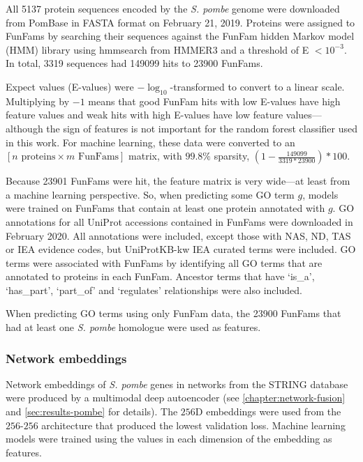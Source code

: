 All \num{5137} protein sequences encoded by the \emph{S. pombe} genome were downloaded from PomBase \cite{Lock2018} in FASTA format on February 21, 2019. Proteins were assigned to FunFams \cite{Das2015b} by searching their sequences against the FunFam hidden Markov model (HMM) library using hmmsearch from HMMER3 \cite{Mistry2013} and a threshold of E $< 10^{-3}$. In total, \num{3319} sequences had \num{149099} hits to \num{23900} FunFams.

Expect values (E-values) were $-\log_{10}$-transformed to convert to a linear scale. Multiplying by $-1$ means that good FunFam hits with low E-values have high feature values and weak hits with high E-values have low feature values---although the sign of features is not important for the random forest classifier used in this work. For machine learning, these data were converted to an $[n \text{ proteins} \times m \text{ FunFams}]$ matrix, with $99.8\%$ sparsity, $(1 - \frac{\num{149099}}{\num{3319}*\num{23900}}) * 100$.

Because \num{23901} FunFams were hit, the feature matrix is very wide---at least from a machine learning perspective. So, when predicting some GO term $g$, models were trained on FunFams that contain at least one protein annotated with $g$. GO \cite{TheGeneOntologyConsortium2015} annotations for all UniProt \cite{Bateman2019} accessions contained in FunFams were downloaded in February 2020. All annotations were included, except those with NAS, ND, TAS or IEA evidence codes, but UniProtKB-kw IEA curated terms were included. GO terms were associated with FunFams by identifying all GO terms that are annotated to proteins in each FunFam. Ancestor terms that have `is\_a', `has\_part', `part\_of' and `regulates' relationships were also included.

When predicting GO terms using only FunFam data, the \num{23900} FunFams that had at least one \emph{S. pombe} homologue were used as features.

\subsubsection{Network embeddings}

Network embeddings of \emph{S. pombe} genes in networks from the STRING \cite{Szklarczyk2017} database were produced by a multimodal deep autoencoder (see \ref{chapter:network-fusion} and \ref{sec:results-pombe} for details). The $256$D embeddings were used from the $256$-$256$ architecture that produced the lowest validation loss.
Machine learning models were trained using the values in each dimension of the embedding as features.

